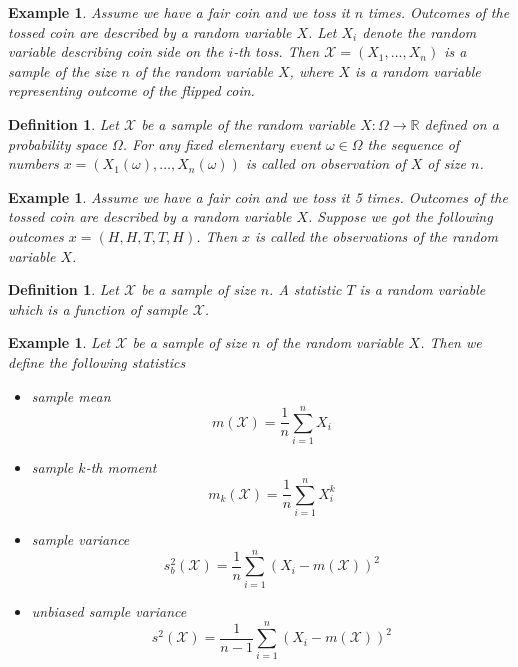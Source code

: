 \documentclass[12pt]{article}
\newtheorem{definition}[theorem]{Definition}
\newtheorem{example}[theorem]{Example}
\begin{document}
\begin{example} Assume we have a fair coin and we toss it $n$ times. Outcomes of
    the tossed coin are described by a random variable $X$. Let $X_i$ denote the
    random variable describing coin side on the $i$-th toss. Then
    $\mathscr{X}=(X_1,\ldots,X_n)$ is a sample of the size $n$ of the random
    variable $X$, where $X$ is a random variable representing outcome of the
    flipped coin.
\end{example}

\begin{definition} Let $\mathscr{X}$ be a sample of the random variable
    $X:\Omega\to\mathbb{R}$ defined on a probability space $\Omega$. For any
    fixed elementary event $\omega\in\Omega$ the sequence of numbers
    $x=(X_1(\omega),\ldots,X_n(\omega))$ is called on observation of $X$ of size
    $n$.
\end{definition}

\begin{example} Assume we have a fair coin and we toss it 5 times. Outcomes of
    the tossed coin are described by a random variable $X$. Suppose we got the
    following outcomes $x=(H,H,T,T,H)$. Then $x$ is called the observations of
    the random variable $X$.
\end{example}

\begin{definition} Let $\mathscr{X}$ be a sample of size $n$. A statistic $T$ is
    a random variable which is a function of sample $\mathscr{X}$.
\end{definition}

\begin{example} Let $\mathscr{X}$ be a sample of size $n$ of the random variable
    $X$. Then we define the following statistics
    \begin{itemize}
        \item sample mean $$m(\mathscr{X})=\frac{1}{n}\sum_{i=1}^n X_i$$
        \item sample $k$-th moment $$m_{k}(\mathscr{X})=\frac{1}{n}\sum_{i=1}^n
                  X_i^k$$
        \item sample variance
              $$
                  s_b^2(\mathscr{X})
                  =\frac{1}{n}\sum_{i=1}^n{(X_i-m(\mathscr{X}))}^2
              $$
        \item unbiased sample variance
              $$
                  s^2(\mathscr{X})
                  =\frac{1}{n-1}\sum_{i=1}^n{(X_i-m(\mathscr{X}))}^2
              $$
    \end{itemize}
\end{example}
\end{document}
